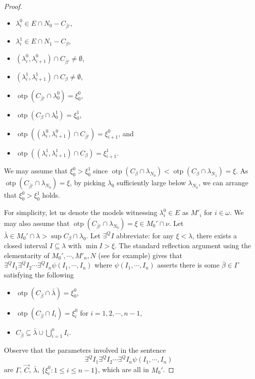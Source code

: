 \documentclass[12pt]{amsart}
\theoremstyle{definition}
\theoremstyle{plain}
\theoremstyle{plain}
\DeclareMathOperator{\otp}{otp}
\begin{document}
\begin{proof}
\begin{itemize}
	\item  $\lambda_i^0\in E\cap N_0-C_{\bar{\beta}'}$,
	\item  $\lambda_i^1\in E\cap N_1-C_{\beta}$,
	\item $(\lambda_i^0, \lambda_{i+1}^0)\cap C_{\bar{\beta}'}\neq \emptyset$,
	\item $(\lambda_i^1, \lambda_{i+1}^1)\cap C_{\beta}\neq \emptyset$,
	\item $\otp(C_{\bar{\beta}'}\cap \lambda_0^0)=\xi_0^0$,
	\item $\otp(C_{\beta}\cap \lambda_0^1)=\xi_0^1$,
	\item $\otp((\lambda_i^0, \lambda_{i+1}^0)\cap C_{\bar{\beta}'})=\xi_{i+1}^0$, and
	\item $\otp((\lambda_i^1, \lambda_{i+1}^1)\cap C_{\beta})=\xi_{i+1}^1$.
	\end{itemize}
We may assume that $\xi^0_0>\xi^1_0$ since $\otp(C_{\beta}\cap \lambda_{N_0})<\otp(C_\beta\cap \lambda_{N_1})=\xi$. As $\otp(C_{\bar{\beta}'}\cap \lambda_{N_0})=\xi$, by picking $\lambda_0$ sufficiently large below $\lambda_{N_0}$, we can arrange that $\xi^0_0>\xi^1_0$ holds.
	
	
For simplicity, let us denote the models witnessing $\lambda_i^0\in E$ as $M'_i$ for $i\in \omega$. We may also assume that $\otp(C_{\bar{\beta}'} \cap \lambda_{N_0})=\xi\in M_0'\cap \nu$. Let $\bar{\lambda}\in M_{0}' \cap \lambda > \sup C_\beta\cap \lambda_0$.
Let $\exists^Q I$ abbreviate: for any $\xi<\lambda$, there exists a closed interval $I \subseteq \lambda$ with $\min I > \xi$. The standard reflection argument using the elementarity of $M_0',\cdots, M'_{n},N$ (see \cite[Lemma 8.1.2]{walksbook} for example) gives that $\exists^Q I_1 \exists^Q I_2 \cdots  \exists^Q I_n \psi(I_1,\cdots, I_n)$ where $\psi(I_1,\cdots, I_n)$ asserts there is some $\bar{\beta}\in \Gamma$ satisfying the following
	\begin{itemize}
	\item $\otp(C_{\bar{\beta}}\cap \bar{\lambda}) =\xi_0^0$,
	\item $\otp(C_{\bar{\beta}}\cap I_i)=\xi_i^0$ for $i=1,2, \cdots, n-1$,
	\item $C_{\bar{\beta}}\subseteq \bar{\lambda} \cup \bigcup_{i=1}^{n} I_i$.
	\end{itemize}
Observe that the parameters involved in the sentence $$\exists^Q I_1 \exists^Q I_2 \cdots  \exists^Q I_n \psi(I_1,\cdots, I_n)$$ are $\Gamma$, $\vec{C}$, $\bar{\lambda}$, $\{\xi_i^0: 1\leq i \leq n-1\}$, which are all in $M_0'$.
	

\end{proof}
\end{document}

